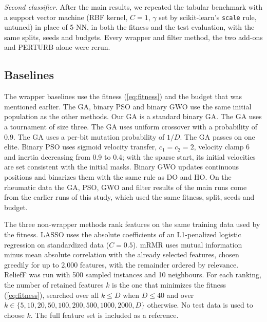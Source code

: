 \documentclass[pdflatex,sn-basic]{sn-jnl}
\begin{document}
\emph{Second classifier.} After the main results, we repeated the tabular benchmark with a support vector machine (RBF kernel, $C=1$, $\gamma$ set by scikit-learn's \texttt{scale} rule, untuned) in place of 5-NN, in both the fitness and the test evaluation, with the same splits, seeds and budgets. Every wrapper and filter method, the two add-ons and PERTURB alone were rerun.

\subsection{Baselines}
The wrapper baselines use the fitness (\ref{eq:fitness}) and the budget that was mentioned earlier. The GA, binary PSO and binary GWO use the same initial population as the other methods. Our GA is a standard binary GA. The GA uses a tournament of size three. The GA uses uniform crossover with a probability of 0.9. The GA uses a per-bit mutation probability of $1/D$. The GA passes on one elite. Binary PSO \citep{kennedy1997} uses sigmoid velocity transfer, $c_1=c_2=2$, velocity clamp 6 and inertia decreasing from 0.9 to 0.4; with the sparse start, its initial velocities are set consistent with the initial masks. Binary GWO \citep{mirjalili2014gwo,emary2016bgwo} updates continuous positions and binarizes them with the same rule as DO and HO. On the rheumatic data the GA, PSO, GWO and filter results of the main runs come from the earlier runs of this study, which used the same fitness, split, seeds and budget.

The three non-wrapper methods rank features on the same training data used by the fitness. LASSO uses the absolute coefficients of an L1-penalized logistic regression \citep{tibshirani1996} on standardized data ($C=0.5$). mRMR \citep{peng2005} uses mutual information minus mean absolute correlation with the already selected features, chosen greedily for up to 2,000 features, with the remainder ordered by relevance. ReliefF \citep{kononenko1994} was run with 500 sampled instances and 10 neighbours. For each ranking, the number of retained features $k$ is the one that minimizes the fitness (\ref{eq:fitness}), searched over all $k\le D$ when $D\le40$ and over $k\in\{5,10,20,50,100,200,500,1000,2000,D\}$ otherwise. No test data is used to choose $k$. The full feature set is included as a reference.
\end{document}
